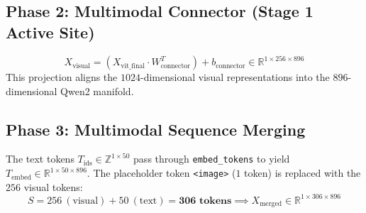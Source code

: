 \documentclass[11pt, a4paper]{article}
\begin{document}
\subsection{Phase 2: Multimodal Connector (Stage 1 Active Site)}
\begin{equation}
    X_{\text{visual}} = (X_{\text{vit\_final}} \cdot W_{\text{connector}}^T) + b_{\text{connector}} \in \mathbb{R}^{1 \times 256 \times 896}
\end{equation}
This projection aligns the $1024$-dimensional visual representations into the $896$-dimensional Qwen2 manifold.

\subsection{Phase 3: Multimodal Sequence Merging}
The text tokens $T_{\text{ids}} \in \mathbb{Z}^{1 \times 50}$ pass through \texttt{embed\_tokens} to yield $T_{\text{embed}} \in \mathbb{R}^{1 \times 50 \times 896}$. The placeholder token \texttt{<image>} ($1$ token) is replaced with the $256$ visual tokens:
\begin{equation}
    S = 256\ (\text{visual}) + 50\ (\text{text}) = \mathbf{306\text{ tokens}} \implies X_{\text{merged}} \in \mathbb{R}^{1 \times 306 \times 896}
\end{equation}
\end{document}
